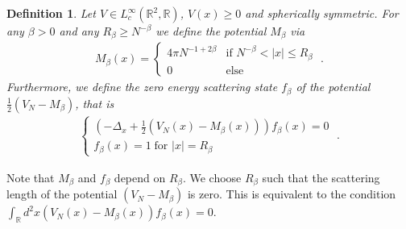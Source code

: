 \documentclass[11pt, english, american]{article}
\newtheorem{definition}[theorem] {Definition}
\begin{document}
\begin{definition}\label{microscopic}
Let $V \in L_c^\infty( \mathbb{R}^2, \mathbb{R})$, $V(x) \geq 0$ and spherically symmetric.
For any $\beta >0$ and any $R_\beta \geq N^{- \beta}$ we define the potential $M_\beta$ via
\begin{align}
\label{eq: defW}
M_\beta(x)
=
 \begin{cases} 
4 \pi N^{-1+2 \beta} & \text{if } N^{- \beta} < |x| \leq R_\beta  \\
   0      & \text{else } 
  \end{cases}
  \;.
\end{align}
Furthermore, we define the zero energy scattering state $f_\beta$ of the potential
$ \frac{1}{2} (V_N-M_\beta)$, that is
\begin{align}
\label{eq: deff}
 \begin{cases} 
\left( - \Delta_x + \frac{1}{2} \left(V_N(x)-M_\beta(x) \right)  \right) f_{\beta}(x)=0
\\
f_{\beta}(x)=1 \; \text{for } |x| = R_\beta 
  \end{cases}
  \;.
\end{align}
\end{definition}
Note that $M_\beta$ and $f_\beta$ depend on $R_\beta$. 
We choose $R_\beta$ such that the scattering length of the potential 
$(V_N-M_\beta)$ is zero. This is equivalent to the condition 
$\int_{\mathbb{R}} d^2x (V_N(x)-M_\beta(x)) f_\beta(x) =0$.
\end{document}
